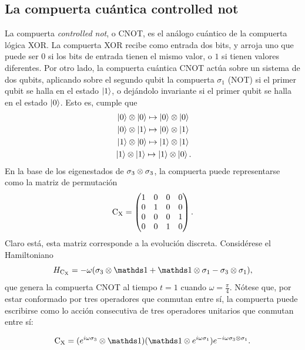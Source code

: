 \subsection{La compuerta cuántica controlled not}

La compuerta \textit{controlled not}, o CNOT, es el análogo cuántico de la compuerta lógica XOR. La compuerta XOR recibe como entrada dos bits, y arroja uno que puede ser $0$ si los bits de entrada tienen el mismo valor, o $1$ si tienen valores diferentes. Por otro lado, la compuerta cuántica CNOT actúa sobre un sistema de dos qubits, aplicando sobre el segundo qubit la compuerta $\sigma_{1}$ (NOT) si el primer qubit se halla en el estado $\ket{1}$, o dejándolo invariante si el primer qubit se halla en el estado $\ket{0}$. Esto es, cumple que \cite{Chuang}
\begin{align*}
    \ket{0}\otimes\ket{0}\mapsto\ket{0}\otimes\ket{0}\\
    \ket{0}\otimes\ket{1}\mapsto\ket{0}\otimes\ket{1}\\
    \ket{1}\otimes\ket{0}\mapsto\ket{1}\otimes\ket{1}\\
    \ket{1}\otimes\ket{1}\mapsto\ket{1}\otimes\ket{0} \rlap{.}
\end{align*}
En la base de los eigenestados de $\sigma_{3}\otimes\sigma_{3}$, la compuerta puede representarse como la matriz de permutación
\begin{equation*}
    \text{C}_{\text{X}}=\begin{pmatrix}
        1&0&0&0\\
        0&1&0&0\\
        0&0&0&1\\
        0&0&1&0
    \end{pmatrix}.
\end{equation*}
Claro está, esta matriz corresponde a la evolución discreta. Considérese el Hamiltoniano
\begin{equation*}
  H_{\cnot}=-\omega(\pauli{3}\otimes\Id+\Id\otimes\pauli{1}-\pauli{3}\otimes\pauli{1}),
\end{equation*}
que genera la compuerta CNOT al tiempo $t=1$ cuando $\omega=\frac{\pi}{4}$. Nótese que, por estar conformado por tres operadores que conmutan entre sí, la compuerta puede escribirse como lo acción consecutiva de tres operadores unitarios que conmutan entre sí:

\begin{equation*}
  \cnot=(e^{i\omega\pauli{3}}\otimes \Id) (\Id \otimes e^{i\omega\pauli{1}}) e^{-i\omega\pauli{3}\otimes\pauli{1}}.
\end{equation*}

